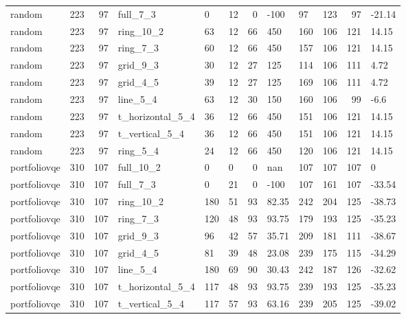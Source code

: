 \begin{longtable}{lrrlllrlllrl}
random & 223 & 97 & full\_7\_3 & 0 & 12 & 0 & -100 & 97 & 123 & 97 & -21.14 \\
random & 223 & 97 & ring\_10\_2 & 63 & 12 & 66 & 450 & 160 & 106 & 121 & 14.15 \\
random & 223 & 97 & ring\_7\_3 & 60 & 12 & 66 & 450 & 157 & 106 & 121 & 14.15 \\
random & 223 & 97 & grid\_9\_3 & 30 & 12 & 27 & 125 & 114 & 106 & 111 & 4.72 \\
random & 223 & 97 & grid\_4\_5 & 39 & 12 & 27 & 125 & 169 & 106 & 111 & 4.72 \\
random & 223 & 97 & line\_5\_4 & 63 & 12 & 30 & 150 & 160 & 106 & 99 & -6.6 \\
random & 223 & 97 & t\_horizontal\_5\_4 & 36 & 12 & 66 & 450 & 151 & 106 & 121 & 14.15 \\
random & 223 & 97 & t\_vertical\_5\_4 & 36 & 12 & 66 & 450 & 151 & 106 & 121 & 14.15 \\
random & 223 & 97 & ring\_5\_4 & 24 & 12 & 66 & 450 & 120 & 106 & 121 & 14.15 \\
portfoliovqe & 310 & 107 & full\_10\_2 & 0 & 0 & 0 & nan & 107 & 107 & 107 & 0 \\
portfoliovqe & 310 & 107 & full\_7\_3 & 0 & 21 & 0 & -100 & 107 & 161 & 107 & -33.54 \\
portfoliovqe & 310 & 107 & ring\_10\_2 & 180 & 51 & 93 & 82.35 & 242 & 204 & 125 & -38.73 \\
portfoliovqe & 310 & 107 & ring\_7\_3 & 120 & 48 & 93 & 93.75 & 179 & 193 & 125 & -35.23 \\
portfoliovqe & 310 & 107 & grid\_9\_3 & 96 & 42 & 57 & 35.71 & 209 & 181 & 111 & -38.67 \\
portfoliovqe & 310 & 107 & grid\_4\_5 & 81 & 39 & 48 & 23.08 & 239 & 175 & 115 & -34.29 \\
portfoliovqe & 310 & 107 & line\_5\_4 & 180 & 69 & 90 & 30.43 & 242 & 187 & 126 & -32.62 \\
portfoliovqe & 310 & 107 & t\_horizontal\_5\_4 & 117 & 48 & 93 & 93.75 & 239 & 193 & 125 & -35.23 \\
portfoliovqe & 310 & 107 & t\_vertical\_5\_4 & 117 & 57 & 93 & 63.16 & 239 & 205 & 125 & -39.02 \\
\end{longtable}
